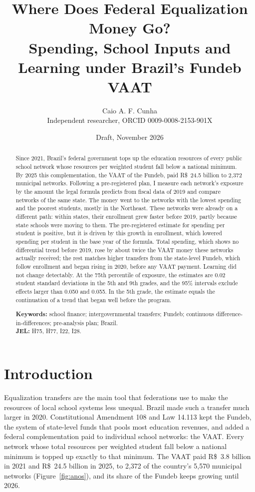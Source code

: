 \documentclass[11pt]{article}
\title{Where Does Federal Equalization Money Go?\\ Spending, School Inputs and Learning under Brazil's Fundeb VAAT}
\author{Caio A. F. Cunha\\ \small Independent researcher, ORCID 0009-0008-2153-901X}
\date{Draft, November 2026}
\newcommand{\reais}{R\$}
\begin{document}
\maketitle

\begin{abstract}
\noindent Since 2021, Brazil's federal government tops up the education resources of every public school network whose resources per weighted student fall below a national minimum. By 2025 this complementation, the VAAT of the Fundeb, paid \reais{}~24.5 billion to 2,372 municipal networks. Following a pre-registered plan, I measure each network's exposure by the amount the legal formula predicts from fiscal data of 2019 and compare networks of the same state. The money went to the networks with the lowest spending and the poorest students, mostly in the Northeast. These networks were already on a different path: within states, their enrollment grew faster before 2019, partly because state schools were moving to them. The pre-registered estimate for spending per student is positive, but it is driven by this growth in enrollment, which lowered spending per student in the base year of the formula. Total spending, which shows no differential trend before 2019, rose by about twice the VAAT money these networks actually received; the rest matches higher transfers from the state-level Fundeb, which follow enrollment and began rising in 2020, before any VAAT payment. Learning did not change detectably. At the 75th percentile of exposure, the estimates are 0.02 student standard deviations in the 5th and 9th grades, and the 95\% intervals exclude effects larger than 0.050 and 0.055. In the 5th grade, the estimate equals the continuation of a trend that began well before the program.

\medskip
\noindent\textbf{Keywords:} school finance; intergovernmental transfers; Fundeb; continuous difference-in-differences; pre-analysis plan; Brazil.\\
\textbf{JEL:} H75, H77, I22, I28.
\end{abstract}

\section{Introduction}

Equalization transfers are the main tool that federations use to make the resources of local school systems less unequal. Brazil made such a transfer much larger in 2020. Constitutional Amendment 108 and Law 14.113 kept the Fundeb, the system of state-level funds that pools most education revenues, and added a federal complementation paid to individual school networks: the VAAT. Every network whose total resources per weighted student fall below a national minimum is topped up exactly to that minimum. The VAAT paid \reais{}~3.8 billion in 2021 and \reais{}~24.5 billion in 2025, to 2,372 of the country's 5,570 municipal networks (Figure~\ref{fig:anos}), and its share of the Fundeb keeps growing until 2026.
\end{document}
